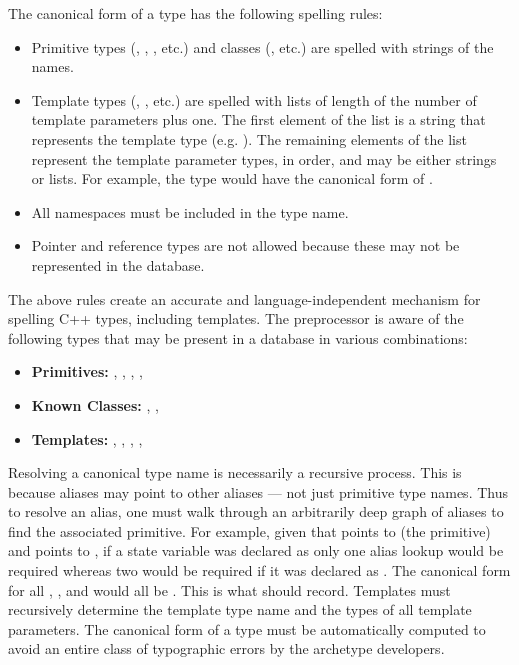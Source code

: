 The canonical form of a type has the following spelling rules:
\begin{itemize}
    \item Primitive types (, , , etc.) 
          and classes (, etc.) are spelled with strings 
          of the names.
    \item Template types (, , etc.) are spelled 
          with lists of length of the number of template parameters plus one.
          The first element of the list is a string that represents the 
          template type (e.g. ). The remaining elements of 
          the list represent the template parameter types, in order, and may 
          be either strings or lists.  For example, the type 
           would have the canonical form 
          of .
    \item All namespaces must be included in the type name.
    \item Pointer and reference types are not allowed because these may not be 
          represented in the database.
\end{itemize}
The above rules create an accurate and language-independent
mechanism for spelling C++ types, including templates. The preprocessor is aware
of the following types that may be present in a \cyclus database in various 
combinations:
\begin{itemize}
    \item \textbf{Primitives:} , , , , 
    \item \textbf{Known Classes:} , , 
    \item \textbf{Templates:} , , , 
                              , 
\end{itemize}

Resolving a canonical type name is necessarily a recursive process.
This is because aliases may point to other aliases --- not just primitive type names.
Thus to resolve an alias, one must walk through an arbitrarily deep graph of aliases 
to find the associated primitive.  For example, given that  points 
to  (the primitive) and  points to , 
if a state variable was declared as  only one alias lookup would
be required whereas two would be required
if it was declared as . The canonical
form for all , , and  would all be 
.  This is what \cycpp should record.  Templates must recursively 
determine the template type name and the types of all template parameters.
The canonical form of a type must be automatically computed to avoid an
entire class of typographic errors by the archetype developers.

